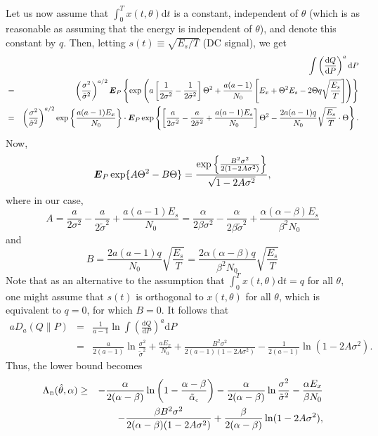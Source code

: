 \documentclass[11pt,epsf]{article}
\newcommand{\tsig}{\tilde{\sigma}}
\newcommand{\ct}{\hat{\theta}}
\newcommand {\bE} {\mbox{\boldmath $E$}}
\begin{document}
Let us now assume that $\int_0^Tx(t,\theta)\mbox{d}t$ is a constant,
independent of $\theta$ (which is as reasonable as assuming that the energy is
independent of $\theta$), and denote this constant by
$q$. Then, letting
$s(t)\equiv\sqrt{E_s/T}$ (DC signal), we get
\begin{eqnarray}
& &\int\left(\frac{\mbox{d}Q}{\mbox{d}P}\right)^a\mbox{d}P\nonumber\\
&=&\left(\frac{\sigma^2}{\tsig^2}\right)^{a/2}
\bE_P\left\{\exp\left(a\left[\frac{1}{2\sigma^2}-\frac{1}{2\tsig^2}\right]\Theta^2
+\frac{a(a-1)}{N_0}\left[E_x+\Theta^2E_s-2\Theta q\sqrt{\frac{E_s}{T}}
\right]\right)\right\}\nonumber\\
&=&\left(\frac{\sigma^2}{\tsig^2}\right)^{a/2}
\exp\left\{\frac{a(a-1)E_x}{N_0}\right\}\cdot
\bE_P\exp\left\{\left[\frac{a}{2\sigma^2}-\frac{a}{2\tsig^2}+\frac{a(a-1)E_s}{N_0}\right]\Theta^2
-\frac{2a(a-1)q}{N_0}\sqrt{\frac{E_s}{T}}\cdot\Theta\right\}.\nonumber
\end{eqnarray}
Now,
\begin{equation}
\bE_P\exp\{A\Theta^2-B\Theta\}=\frac{\exp\left\{\frac{B^2\sigma^2}{2(1-2A
\sigma^2)}\right\}}{\sqrt{1-2A\sigma^2}},
\end{equation}
where in our case,
\begin{equation}
A=\frac{a}{2\sigma^2}-\frac{a}{2\tsig^2}+\frac{a(a-1)E_s}{N_0}
=\frac{\alpha}{2\beta\sigma^2}-\frac{\alpha}{2\beta\tsig^2}+\frac{\alpha(\alpha-\beta)E_s}{\beta^2N_0}
\end{equation}
and
\begin{equation}
B=\frac{2a(a-1)q}{N_0}\sqrt{\frac{E_s}{T}}
=\frac{2\alpha(\alpha-\beta)q}{\beta^2N_0}\sqrt{\frac{E_s}{T}}
\end{equation}
Note that as an alternative to the assumption that $\int_0^T x(t,\theta)\mbox{d}t=q$ for
all $\theta$, one might assume that $s(t)$ is orthogonal to $x(t,\theta)$ for
all $\theta$, which is equivalent to $q=0$, for which $B=0$.
It follows that
\begin{eqnarray}
aD_a(Q\|P)&=&\frac{1}{a-1}\ln\int\left(\frac{\mbox{d}Q}{\mbox{d}P}\right)^a\mbox{d}P\\
&=&\frac{a}{2(a-1)}\ln\frac{\sigma^2}{\tsig^2}+\frac{aE_x}{N_0}+\frac{B^2\sigma^2}{2(a-1)(1-2A
\sigma^2)}-\frac{1}{2(a-1)}\ln(1-2A\sigma^2).
\end{eqnarray}
Thus, the lower bound becomes
\begin{eqnarray}
\Lambda_{\mbox{\tiny B}}(\ct,\alpha)
&\ge&-\frac{\alpha}{2(\alpha-\beta)}\ln\left(1-\frac{\alpha-\beta}{\tilde{\alpha}_{\mbox{\tiny
c}}}\right)-\frac{\alpha}{2(\alpha-\beta)}\ln\frac{\sigma^2}{\tsig^2}
-\frac{\alpha E_x}{\beta N_0}\nonumber\\
& & -\frac{\beta B^2\sigma^2}{2(\alpha-\beta)(1-2A
\sigma^2)}+\frac{\beta}{2(\alpha-\beta)}\ln(1-2A\sigma^2),
\end{eqnarray}
\end{document}
